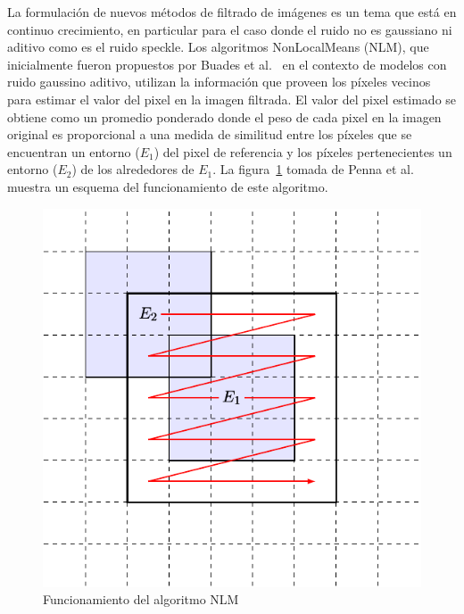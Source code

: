 \documentclass[11pt]{article}
\begin{document}


La formulación de nuevos métodos de filtrado de imágenes es un tema que está en continuo crecimiento, en particular para el caso donde el ruido no es gaussiano ni aditivo como es el ruido speckle. Los algoritmos NonLocalMeans (NLM), que inicialmente fueron propuestos por Buades et al.~\cite{Buades2005} en el contexto de modelos con ruido gaussino aditivo, utilizan la información que proveen los píxeles vecinos para estimar el valor del pixel en la imagen filtrada. El valor del pixel estimado se obtiene como un promedio ponderado donde el peso de cada pixel en la imagen original es proporcional a una medida de similitud entre los píxeles que se encuentran
un entorno ($E_1$) del pixel de referencia y los píxeles pertenecientes un entorno ($E_2$) de los alrededores de $E_1$. La figura~\ref{NLM} tomada de Penna et al.~\cite{Penna2013} muestra un esquema del funcionamiento de este algoritmo. 

\begin{figure}[hbt]
	\label{NLM}
	\centering
	\includegraphics[scale=0.6]{../../Figures/Proyectos/UNGS2020/filtros.pdf}
	\caption{Funcionamiento del algoritmo NLM}
\end{figure}
\end{document}
